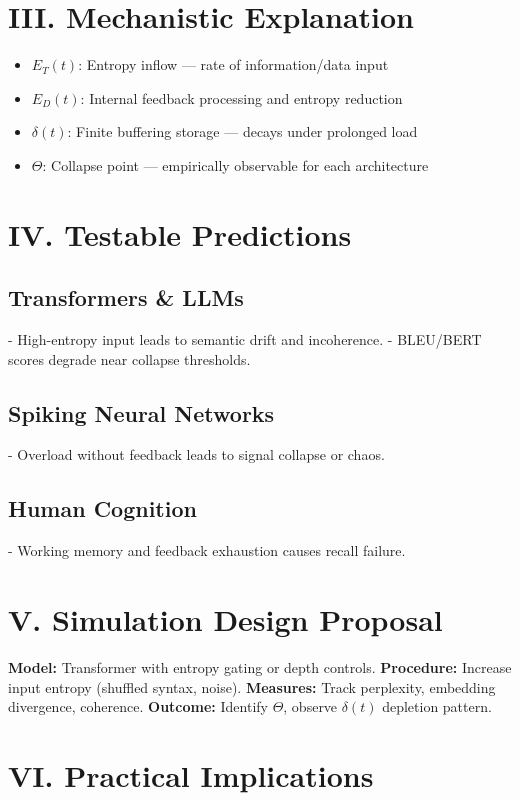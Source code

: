 \documentclass[12pt]{article}
\begin{document}
\section*{III. Mechanistic Explanation}

\begin{itemize}
  \item $E_T(t)$: Entropy inflow — rate of information/data input
  \item $E_D(t)$: Internal feedback processing and entropy reduction
  \item $\delta(t)$: Finite buffering storage — decays under prolonged load
  \item $\Theta$: Collapse point — empirically observable for each architecture
\end{itemize}

\section*{IV. Testable Predictions}

\subsection*{Transformers \& LLMs}
- High-entropy input leads to semantic drift and incoherence.
- BLEU/BERT scores degrade near collapse thresholds.

\subsection*{Spiking Neural Networks}
- Overload without feedback leads to signal collapse or chaos.

\subsection*{Human Cognition}
- Working memory and feedback exhaustion causes recall failure.

\section*{V. Simulation Design Proposal}

\textbf{Model:} Transformer with entropy gating or depth controls.  
\textbf{Procedure:} Increase input entropy (shuffled syntax, noise).  
\textbf{Measures:} Track perplexity, embedding divergence, coherence.  
\textbf{Outcome:} Identify $\Theta$, observe $\delta(t)$ depletion pattern.

\section*{VI. Practical Implications}
\end{document}
